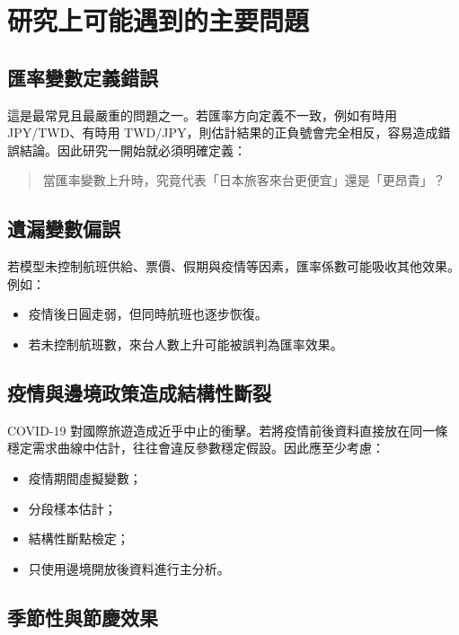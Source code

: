 \documentclass[12pt,a4paper,fontset=none]{ctexart}
\begin{document}
\section{研究上可能遇到的主要問題}

\subsection{匯率變數定義錯誤}

這是最常見且最嚴重的問題之一。若匯率方向定義不一致，例如有時用 JPY/TWD、有時用 TWD/JPY，則估計結果的正負號會完全相反，容易造成錯誤結論。因此研究一開始就必須明確定義：

\begin{quote}
當匯率變數上升時，究竟代表「日本旅客來台更便宜」還是「更昂貴」？
\end{quote}

\subsection{遺漏變數偏誤}

若模型未控制航班供給、票價、假期與疫情等因素，匯率係數可能吸收其他效果。例如：

\begin{itemize}
  \item 疫情後日圓走弱，但同時航班也逐步恢復。
  \item 若未控制航班數，來台人數上升可能被誤判為匯率效果。
\end{itemize}

\subsection{疫情與邊境政策造成結構性斷裂}

COVID-19 對國際旅遊造成近乎中止的衝擊。若將疫情前後資料直接放在同一條穩定需求曲線中估計，往往會違反參數穩定假設。因此應至少考慮：

\begin{itemize}
  \item 疫情期間虛擬變數；
  \item 分段樣本估計；
  \item 結構性斷點檢定；
  \item 只使用邊境開放後資料進行主分析。
\end{itemize}

\subsection{季節性與節慶效果}
\end{document}
